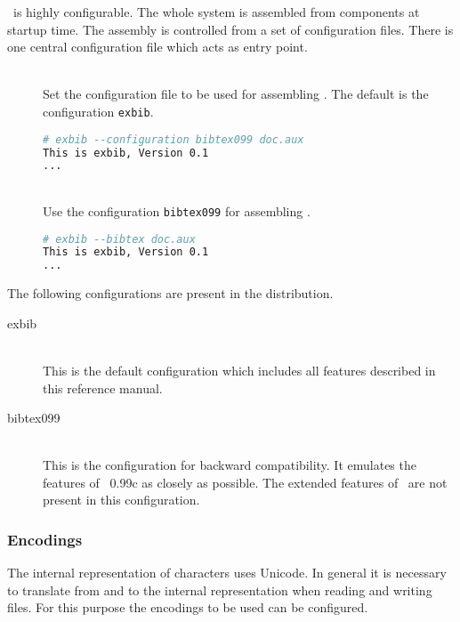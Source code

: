 \ExBib\ is highly configurable. The whole system is assembled from
components at startup time. The assembly is controlled from a set of
configuration files. There is one central configuration file which
acts as entry point.

\begin{description}
\item[ ]
\item[ ]\ \\
  Set the configuration file to be used for assembling \ExBib. The
  default is the configuration \texttt{exbib}.
\begin{lstlisting}[language=sh]
# exbib --configuration bibtex099 doc.aux
This is exbib, Version 0.1
...
\end{lstlisting}

\item[]
\item[]\ \\
  Use the configuration \texttt{bibtex099} for assembling \ExBib.
\begin{lstlisting}[language=sh]
# exbib --bibtex doc.aux
This is exbib, Version 0.1
...
\end{lstlisting}
\end{description}

The following configurations are present in the distribution.

\begin{description}
\item[exbib]\ \\
  This is the default configuration which includes all features
  described in this reference manual.
\item[bibtex099]\ \\
  This is the configuration for backward compatibility. It emulates
  the features of \BibTeX~0.99c as closely as possible. The extended
  features of \ExBib\ are not present in this configuration.
\end{description}


\subsubsection{Encodings}%
\label{sec:encodings}%

The internal representation of characters uses Unicode.
In general it is necessary to translate from and to the internal
representation when reading and writing files. For this purpose the
encodings to be used can be configured.

